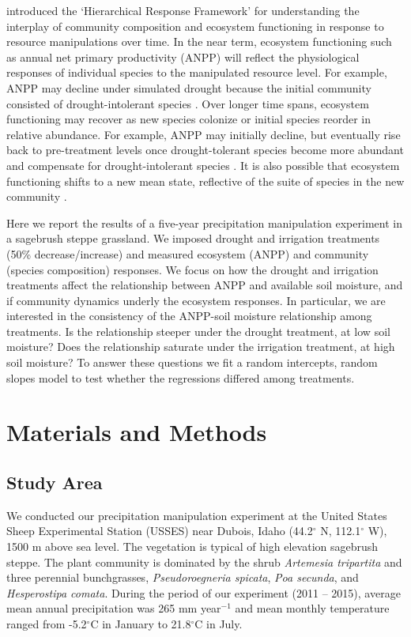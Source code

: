 \documentclass[fleqn,10pt]{wlpeerj} %
\begin{document}
\citet{Smith2009} introduced the `Hierarchical Response Framework' for
understanding the interplay of community composition and ecosystem
functioning in response to resource manipulations over time. In the near
term, ecosystem functioning such as annual net primary productivity
(ANPP) will reflect the physiological responses of individual species to
the manipulated resource level. For example, ANPP may decline under
simulated drought because the initial community consisted of
drought-intolerant species \citep{Hoover2014}. Over longer time spans,
ecosystem functioning may recover as new species colonize or initial
species reorder in relative abundance. For example, ANPP may initially
decline, but eventually rise back to pre-treatment levels once
drought-tolerant species become more abundant and compensate for
drought-intolerant species \citep{Hoover2014}. It is also possible that
ecosystem functioning shifts to a new mean state, reflective of the
suite of species in the new community \citep{Knapp2012}.

Here we report the results of a five-year precipitation manipulation
experiment in a sagebrush steppe grassland. We imposed drought and
irrigation treatments (50\% decrease/increase) and measured ecosystem
(ANPP) and community (species composition) responses. We focus on how
the drought and irrigation treatments affect the relationship between
ANPP and available soil moisture, and if community dynamics underly the
ecosystem responses. In particular, we are interested in the consistency
of the ANPP-soil moisture relationship among treatments. Is the
relationship steeper under the drought treatment, at low soil moisture?
Does the relationship saturate under the irrigation treatment, at high
soil moisture? To answer these questions we fit a random intercepts,
random slopes model to test whether the regressions differed among
treatments.

\section{Materials and Methods}\label{materials-and-methods}

\subsection{Study Area}\label{study-area}

We conducted our precipitation manipulation experiment at the United
States Sheep Experimental Station (USSES) near Dubois, Idaho
(44.2\(^{\circ}\) N, 112.1\(^{\circ}\) W), 1500 m above sea level. The
vegetation is typical of high elevation sagebrush steppe. The plant
community is dominated by the shrub \emph{Artemesia tripartita} and
three perennial bunchgrasses, \emph{Pseudoroegneria spicata}, \emph{Poa
secunda}, and \emph{Hesperostipa comata}. During the period of our
experiment (2011 -- 2015), average mean annual precipitation was 265 mm
year\(\phantom{}^{-1}\) and mean monthly temperature ranged from
-5.2\(^{\circ}\)C in January to 21.8\(^{\circ}\)C in July.
\end{document}
